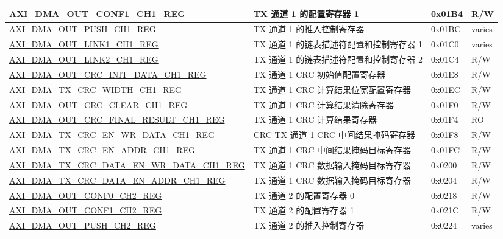 \begin{longtable}{ | l | l | p{1.3cm} | l | }
\hyperref[regdesc:AXIDMAOUTCONF1CHNREG]{AXI\_DMA\_OUT\_CONF1\_CH1\_REG} & TX 通道 1 的配置寄存器 1 & 0x01B4 & R/W \\ \hline
\hyperref[regdesc:AXIDMAOUTPUSHCHNREG]{AXI\_DMA\_OUT\_PUSH\_CH1\_REG} & TX 通道 1 的推入控制寄存器 & 0x01BC & varies \\ \hline
\hyperref[regdesc:AXIDMAOUTLINK1CHNREG]{AXI\_DMA\_OUT\_LINK1\_CH1\_REG} & TX 通道 1 的链表描述符配置和控制寄存器 1 & 0x01C0 & varies \\ \hline
\hyperref[regdesc:AXIDMAOUTLINK2CHNREG]{AXI\_DMA\_OUT\_LINK2\_CH1\_REG} & TX 通道 1 的链表描述符配置和控制寄存器 2 & 0x01C4 & R/W \\ \hline
\hyperref[regdesc:AXIDMAOUTCRCINITDATACHNREG]{AXI\_DMA\_OUT\_CRC\_INIT\_DATA\_CH1\_REG} & TX 通道 1 CRC 初始值配置寄存器 & 0x01E8 & R/W \\ \hline
\hyperref[regdesc:AXIDMATXCRCWIDTHCHNREG]{AXI\_DMA\_TX\_CRC\_WIDTH\_CH1\_REG} & TX 通道 1 CRC 计算结果位宽配置寄存器 & 0x01EC & R/W \\ \hline
\hyperref[regdesc:AXIDMAOUTCRCCLEARCHNREG]{AXI\_DMA\_OUT\_CRC\_CLEAR\_CH1\_REG} & TX 通道 1 CRC 计算结果清除寄存器 & 0x01F0 & R/W \\ \hline
\hyperref[regdesc:AXIDMAOUTCRCFINALRESULTCHNREG]{AXI\_DMA\_OUT\_CRC\_FINAL\_RESULT\_CH1\_REG} & TX 通道 1 CRC 计算结果寄存器 & 0x01F4 & RO \\ \hline
\hyperref[regdesc:AXIDMATXCRCENWRDATACHNREG]{AXI\_DMA\_TX\_CRC\_EN\_WR\_DATA\_CH1\_REG} & CRC TX 通道 1 CRC 中间结果掩码寄存器 & 0x01F8 & R/W \\ \hline
\hyperref[regdesc:AXIDMATXCRCENADDRCHNREG]{AXI\_DMA\_TX\_CRC\_EN\_ADDR\_CH1\_REG} & TX 通道 1 CRC 中间结果掩码目标寄存器 & 0x01FC & R/W \\ \hline
\hyperref[regdesc:AXIDMATXCRCDATAENWRDATACHNREG]{AXI\_DMA\_TX\_CRC\_DATA\_EN\_WR\_DATA\_CH1\_REG} & TX 通道 1 CRC 数据输入掩码目标寄存器 & 0x0200 & R/W \\ \hline
\hyperref[regdesc:AXIDMATXCRCDATAENADDRCHNREG]{AXI\_DMA\_TX\_CRC\_DATA\_EN\_ADDR\_CH1\_REG} & TX 通道 1 CRC 数据输入掩码目标寄存器 & 0x0204 & R/W \\ \hline
\hyperref[regdesc:AXIDMAOUTCONF0CHNREG]{AXI\_DMA\_OUT\_CONF0\_CH2\_REG} & TX 通道 2 的配置寄存器 0 & 0x0218 & R/W \\ \hline
\hyperref[regdesc:AXIDMAOUTCONF1CHNREG]{AXI\_DMA\_OUT\_CONF1\_CH2\_REG} & TX 通道 2 的配置寄存器 1 & 0x021C & R/W \\ \hline
\hyperref[regdesc:AXIDMAOUTPUSHCHNREG]{AXI\_DMA\_OUT\_PUSH\_CH2\_REG} & TX 通道 2 的推入控制寄存器 & 0x0224 & varies \\ \hline

\end{longtable}
